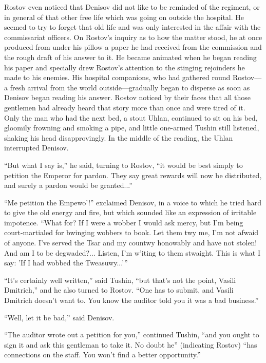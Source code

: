 Rostov even noticed that Denisov did not like to be reminded of
the regiment, or in general of that other free life which was
going on outside the hospital. He seemed to try to forget that
old life and was only interested in the affair with the
commissariat officers. On Rostov's inquiry as to how the matter
stood, he at once produced from under his pillow a paper he had
received from the commission and the rough draft of his answer to
it. He became animated when he began reading his paper and
specially drew Rostov's attention to the stinging rejoinders he
made to his enemies. His hospital companions, who had gathered
round Rostov---a fresh arrival from the world outside---gradually
began to disperse as soon as Denisov began reading his
answer. Rostov noticed by their faces that all those gentlemen
had already heard that story more than once and were tired of
it. Only the man who had the next bed, a stout Uhlan, continued
to sit on his bed, gloomily frowning and smoking a pipe, and
little one-armed Tushin still listened, shaking his head
disapprovingly. In the middle of the reading, the Uhlan
interrupted Denisov.

``But what I say is,'' he said, turning to Rostov, ``it would be
best simply to petition the Emperor for pardon. They say great
rewards will now be distributed, and surely a pardon would be
granted...''

``Me petition the Empewo'!'' exclaimed Denisov, in a voice to
which he tried hard to give the old energy and fire, but which
sounded like an expression of irritable impotence. ``What for? If
I were a wobber I would ask mercy, but I'm being court-martialed
for bwinging wobbers to book.  Let them twy me, I'm not afwaid of
anyone. I've served the Tsar and my countwy honowably and have
not stolen! And am I to be degwaded?...  Listen, I'm w'iting to
them stwaight. This is what I say: 'If I had wobbed the
Tweasuwy...'{}''

``It's certainly well written,'' said Tushin, ``but that's not
the point, Vasili Dmitrich,'' and he also turned to Rostov. ``One
has to submit, and Vasili Dmitrich doesn't want to. You know the
auditor told you it was a bad business.''

``Well, let it be bad,'' said Denisov.

``The auditor wrote out a petition for you,'' continued Tushin,
``and you ought to sign it and ask this gentleman to take it. No
doubt he'' (indicating Rostov) ``has connections on the
staff. You won't find a better opportunity.''

